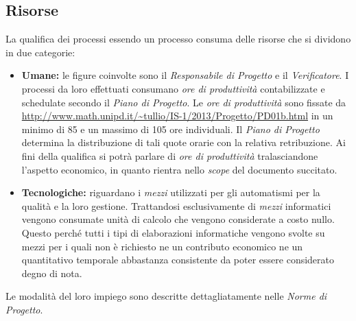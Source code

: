 	\subsection{Risorse}
	La qualifica dei processi essendo un processo consuma delle risorse che si dividono in due categorie:
		\begin{itemize}
  			\item \textbf{Umane:} le figure coinvolte sono il \emph{Responsabile di Progetto} e il \emph{Verificatore}. I processi da loro effettuati consumano \emph{ore di produttività}  contabilizzate e schedulate secondo il \emph{Piano di Progetto}. Le \emph{ore di produttività} sono fissate da \url{http://www.math.unipd.it/~tullio/IS-1/2013/Progetto/PD01b.html} in un minimo di 85 e un massimo di 105 ore individuali. Il \emph{Piano di Progetto} determina la distribuzione di tali quote orarie con la relativa retribuzione. Ai fini della qualifica si potrà parlare di \emph{ore di produttività} tralasciandone l'aspetto economico, in quanto rientra nello \emph{scope} del documento succitato. 
  			
  			\item \textbf{Tecnologiche:} riguardano i \emph{mezzi} utilizzati per gli automatismi per la qualità e la loro gestione. Trattandosi esclusivamente di \emph{mezzi} informatici vengono consumate unità di calcolo che vengono considerate a costo nullo. Questo perché tutti i tipi di elaborazioni informatiche vengono svolte su mezzi per i quali non è richiesto ne un contributo economico ne un quantitativo temporale abbastanza consistente da poter essere considerato degno di nota.
		\end{itemize}
		
	Le modalità del loro impiego sono descritte dettagliatamente nelle \emph{Norme di Progetto}.
	
		

